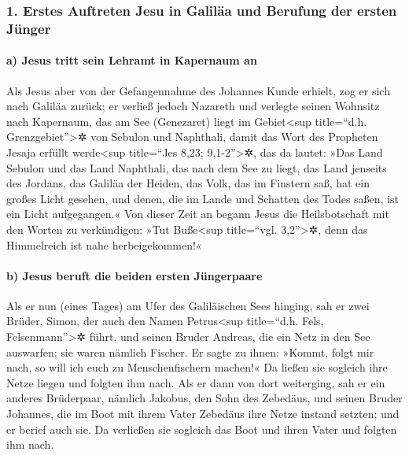 \hypertarget{erstes-auftreten-jesu-in-galiluxe4a-und-berufung-der-ersten-juxfcnger}{%
\subsubsection{1. Erstes Auftreten Jesu in Galiläa und Berufung der
ersten
Jünger}\label{erstes-auftreten-jesu-in-galiluxe4a-und-berufung-der-ersten-juxfcnger}}

\hypertarget{a-jesus-tritt-sein-lehramt-in-kapernaum-an}{%
\paragraph{a) Jesus tritt sein Lehramt in Kapernaum
an}\label{a-jesus-tritt-sein-lehramt-in-kapernaum-an}}

 Als Jesus aber von der Gefangennahme des Johannes Kunde
erhielt, zog er sich nach Galiläa zurück;  er verließ
jedoch Nazareth und verlegte seinen Wohnsitz nach Kapernaum, das am See
(Genezaret) liegt im Gebiet\textless sup title=``d.h.
Grenzgebiet''\textgreater✲ von Sebulon und Naphthali, 
damit das Wort des Propheten Jesaja erfüllt werde\textless sup
title=``Jes 8,23; 9,1-2''\textgreater✲, das da lautet: 
»Das Land Sebulon und das Land Naphthali, das nach dem See zu liegt, das
Land jenseits des Jordans, das Galiläa der Heiden,  das
Volk, das im Finstern saß, hat ein großes Licht gesehen, und denen, die
im Lande und Schatten des Todes saßen, ist ein Licht aufgegangen.«
 Von dieser Zeit an begann Jesus die Heilsbotschaft mit
den Worten zu verkündigen: »Tut Buße\textless sup title=``vgl.
3,2''\textgreater✲, denn das Himmelreich ist nahe herbeigekommen!«

\hypertarget{b-jesus-beruft-die-beiden-ersten-juxfcngerpaare}{%
\paragraph{b) Jesus beruft die beiden ersten
Jüngerpaare}\label{b-jesus-beruft-die-beiden-ersten-juxfcngerpaare}}

 Als er nun (eines Tages) am Ufer des Galiläischen Sees
hinging, sah er zwei Brüder, Simon, der auch den Namen
Petrus\textless sup title=``d.h. Fels, Felsenmann''\textgreater✲ führt,
und seinen Bruder Andreas, die ein Netz in den See auswarfen; sie waren
nämlich Fischer.  Er sagte zu ihnen: »Kommt, folgt mir
nach, so will ich euch zu Menschenfischern machen!«  Da
ließen sie sogleich ihre Netze liegen und folgten ihm nach.
 Als er dann von dort weiterging, sah er ein anderes
Brüderpaar, nämlich Jakobus, den Sohn des Zebedäus, und seinen Bruder
Johannes, die im Boot mit ihrem Vater Zebedäus ihre Netze instand
setzten; und er berief auch sie.  Da verließen sie
sogleich das Boot und ihren Vater und folgten ihm nach.

